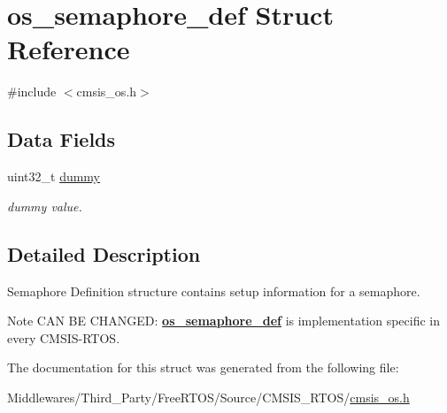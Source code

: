 \hypertarget{structos__semaphore__def}{}\section{os\+\_\+semaphore\+\_\+def Struct Reference}
\label{structos__semaphore__def}


{\ttfamily \#include $<$cmsis\+\_\+os.\+h$>$}

\subsection*{Data Fields}
\begin{DoxyCompactItemize}
\item 
\mbox{\label{structos__semaphore__def_a44b7a3baf02bac7ad707e8f2f5eca1ca}} 
uint32\+\_\+t \mbox{\hyperlink{structos__semaphore__def_a44b7a3baf02bac7ad707e8f2f5eca1ca}{dummy}}
\begin{DoxyCompactList}\small\item\em dummy value. \end{DoxyCompactList}\end{DoxyCompactItemize}


\subsection{Detailed Description}
Semaphore Definition structure contains setup information for a semaphore. \begin{DoxyNote}{Note}
C\+AN BE C\+H\+A\+N\+G\+ED\+: {\bfseries \mbox{\hyperlink{structos__semaphore__def}{os\+\_\+semaphore\+\_\+def}}} is implementation specific in every C\+M\+S\+I\+S-\/\+R\+T\+OS. 
\end{DoxyNote}


The documentation for this struct was generated from the following file\+:\begin{DoxyCompactItemize}
\item 
Middlewares/\+Third\+\_\+\+Party/\+Free\+R\+T\+O\+S/\+Source/\+C\+M\+S\+I\+S\+\_\+\+R\+T\+O\+S/\mbox{\hyperlink{cmsis__os_8h}{cmsis\+\_\+os.\+h}}\end{DoxyCompactItemize}
